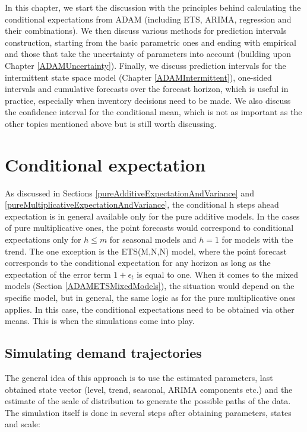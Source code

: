 \documentclass[]{book}
\theoremstyle{definition}
\theoremstyle{definition}
\theoremstyle{definition}
\theoremstyle{definition}
\theoremstyle{remark}
\begin{document}
In this chapter, we start the discussion with the principles behind calculating the conditional expectations from ADAM (including ETS, ARIMA, regression and their combinations). We then discuss various methods for prediction intervals construction, starting from the basic parametric ones and ending with empirical and those that take the uncertainty of parameters into account (building upon Chapter \ref{ADAMUncertainty}). Finally, we discuss prediction intervals for the intermittent state space model (Chapter \ref{ADAMIntermittent}), one-sided intervals and cumulative forecasts over the forecast horizon, which is useful in practice, especially when inventory decisions need to be made. We also discuss the confidence interval for the conditional mean, which is not as important as the other topics mentioned above but is still worth discussing.

\hypertarget{ADAMForecastingExpectation}{%
\section{Conditional expectation}\label{ADAMForecastingExpectation}}

As discussed in Sections \ref{pureAdditiveExpectationAndVariance} and \ref{pureMultiplicativeExpectationAndVariance}, the conditional h steps ahead expectation is in general available only for the pure additive models. In the cases of pure multiplicative ones, the point forecasts would correspond to conditional expectations only for \(h \leq m\) for seasonal models and \(h=1\) for models with the trend. The one exception is the ETS(M,N,N) model, where the point forecast corresponds to the conditional expectation for any horizon as long as the expectation of the error term \(1+\epsilon_t\) is equal to one. When it comes to the mixed models (Section \ref{ADAMETSMixedModels}), the situation would depend on the specific model, but in general, the same logic as for the pure multiplicative ones applies. In this case, the conditional expectations need to be obtained via other means. This is when the simulations come into play.

\hypertarget{ADAMForecastingExpectationSimulations}{%
\subsection{Simulating demand trajectories}\label{ADAMForecastingExpectationSimulations}}

The general idea of this approach is to use the estimated parameters, last obtained state vector (level, trend, seasonal, ARIMA components etc.) and the estimate of the scale of distribution to generate the possible paths of the data. The simulation itself is done in several steps after obtaining parameters, states and scale:
\end{document}
